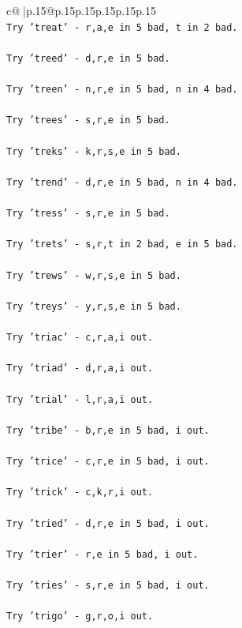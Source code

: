 \documentclass{article}
\begin{document}
{\begin{supertabular}{c@{$\;$}|p{.15\linewidth}@{}p{.15\linewidth}p{.15\linewidth}p{.15\linewidth}p{.15\linewidth}p{.15\linewidth}}
{{{\\ 
\texttt{Try 'treat' {-} r,a,e in 5 bad, t in 2 bad.} \\
\\ 
\texttt{Try 'treed' {-} d,r,e in 5 bad.} \\
\\ 
\texttt{Try 'treen' {-} n,r,e in 5 bad, n in 4 bad.} \\
\\ 
\texttt{Try 'trees' {-} s,r,e in 5 bad.} \\
\\ 
\texttt{Try 'treks' {-} k,r,s,e in 5 bad.} \\
\\ 
\texttt{Try 'trend' {-} d,r,e in 5 bad, n in 4 bad.} \\
\\ 
\texttt{Try 'tress' {-} s,r,e in 5 bad.} \\
\\ 
\texttt{Try 'trets' {-} s,r,t in 2 bad, e in 5 bad.} \\
\\ 
\texttt{Try 'trews' {-} w,r,s,e in 5 bad.} \\
\\ 
\texttt{Try 'treys' {-} y,r,s,e in 5 bad.} \\
\\ 
\texttt{Try 'triac' {-} c,r,a,i out.} \\
\\ 
\texttt{Try 'triad' {-} d,r,a,i out.} \\
\\ 
\texttt{Try 'trial' {-} l,r,a,i out.} \\
\\ 
\texttt{Try 'tribe' {-} b,r,e in 5 bad, i out.} \\
\\ 
\texttt{Try 'trice' {-} c,r,e in 5 bad, i out.} \\
\\ 
\texttt{Try 'trick' {-} c,k,r,i out.} \\
\\ 
\texttt{Try 'tried' {-} d,r,e in 5 bad, i out.} \\
\\ 
\texttt{Try 'trier' {-} r,e in 5 bad, i out.} \\
\\ 
\texttt{Try 'tries' {-} s,r,e in 5 bad, i out.} \\
\\ 
\texttt{Try 'trigo' {-} g,r,o,i out.} \\
}}}
\end{supertabular}}
\end{document}
